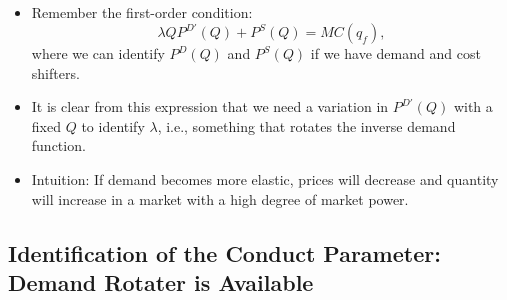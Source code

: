 \documentclass[
]{book}
\providecommand{\tightlist}{%
  \setlength{\itemsep}{0pt}\setlength{\parskip}{0pt}}
\begin{document}
\begin{itemize}
\tightlist
\item
  Remember the first-order condition:
  \begin{equation}
  \lambda Q P^{D\prime}(Q) + P^S(Q) = MC(q_f),
  \end{equation}
  where we can identify \(P^D(Q)\) and \(P^S(Q)\) if we have demand and cost shifters.
\item
  It is clear from this expression that we need a variation in \(P^{D\prime}(Q)\) with a fixed \(Q\) to identify \(\lambda\), i.e., something that rotates the inverse demand function.
\item
  Intuition: If demand becomes more elastic, prices will decrease and quantity will increase in a market with a high degree of market power.
\end{itemize}

\hypertarget{identification-of-the-conduct-parameter-demand-rotater-is-available}{%
\subsection{Identification of the Conduct Parameter: Demand Rotater is Available}\label{identification-of-the-conduct-parameter-demand-rotater-is-available}}
\end{document}
